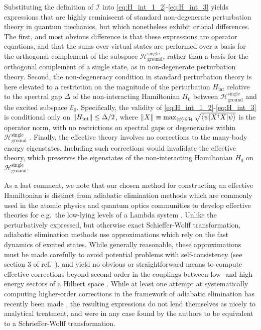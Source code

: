 \documentclass[preprint,showkeys,nofootinbib]{revtex4-1}
\renewcommand{\t}{\text} %
\newcommand{\bk}{\braket} %
\newcommand{\E}{\mathcal{E}}
\renewcommand{\H}{\mathcal{H}}
\newcommand{\I}{\mathcal{I}}
\newcommand{\1}{\mathds{1}}
\begin{document}
Substituting the definition of $\I$ into
\eqref{eq:H_int_1_2}-\eqref{eq:H_int_3} yields expressions that are
highly reminiscent of standard non-degenerate perturbation theory in
quantum mechanics, but which nonetheless exhibit crucial differences.
The first, and most obvious difference is that these expressions are
operator equations, and that the sums over virtual states are
performed over a basis for the orthogonal complement of the subspace
$\H_{\t{ground}}^{\t{single}}$, rather than a basis for the orthogonal
complement of a single state, as in non-degenerate perturbation
theory.  Second, the non-degeneracy condition in standard perturbation
theory is here elevated to a restriction on the magnitude of the
perturbation $H_{\t{int}}$ relative to the spectral gap $\Delta$ of
the non-interacting Hamiltonian $H_0$ between
$\H_{\t{ground}}^{\t{single}}$ and the excited subspace $\E_0$.
Specifically, the validity of \eqref{eq:H_int_1_2}-\eqref{eq:H_int_3}
is conditional only on $\norm{H_{\t{int}}}\le\Delta/2$, where
$\norm{X}\equiv\max_{\ket\psi\in\H}\sqrt{\bk{\psi|X^\dag X|\psi}}$ is
the operator norm, with no restrictions on spectral gaps or
degeneracies within $\H_{\t{ground}}^{\t{single}}$ \cite{davis1969new,
  bravyi2011schrieffer}.  Finally, the effective theory involves no
corrections to the many-body energy eigenstates.  Including such
corrections would invalidate the effective theory, which preserves the
eigenstates of the non-interacting Hamiltonian $H_0$ on
$\H_{\t{ground}}^{\t{single}}$.

As a last comment, we note that our chosen method for constructing an
effective Hamiltonian is distinct from adiabatic elimination methods
which are commonly used in the atomic physics and quantum optics
communities to develop effective theories for e.g.~the low-lying
levels of a Lambda system \cite{brion2007adiabatic,
  james2007effective, reiter2012effective, sanz2016adiabatic}.  Unlike
the perturbatively expressed, but otherwise exact Schieffer-Wolff
transformation, adiabatic elimination methods use approximations which
rely on the fast dynamics of excited states.  While generally
reasonable, these approximations must be made carefully to avoid
potential problems with self-consistency (see section 3 of
ref.~\cite{brion2007adiabatic}), and yield no obvious or
straightforward means to compute effective corrections beyond second
order in the couplings between low- and high-energy sectors of a
Hilbert space \cite{james2007effective, reiter2012effective,
  sanz2016adiabatic}.  While at least one attempt at systematically
computing higher-order corrections in the framework of adiabatic
elimination has recently been made \cite{sanz2016adiabatic}, the
resulting expressions do not lend themselves as nicely to analytical
treatment, and were in any case found by the authors to be equivalent
to a Schrieffer-Wolff transformation.
\end{document}

